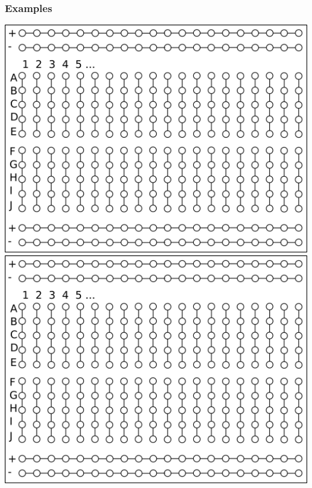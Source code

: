 \documentclass[fleqn]{beamer} %
\newcommand{\sectionIIsubsectionIVtitle}{Examples}
\begin{document}
			\begin{frame}
				\frametitle{\sectionIIsubsectionIVtitle}

				\includegraphics[scale=.050]{images/breadboard_template.png} \hspace{10mm}\includegraphics[scale=.050]{images/breadboard_template.png} 

			\end{frame}
\end{document}
